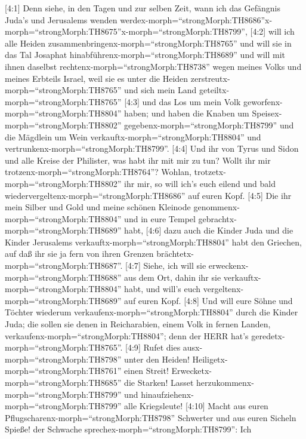  {[}4:1{]} Denn siehe, in den Tagen und zur selben Zeit,
wann ich das Gefängnis Juda's und Jerusalems wenden
werdex-morph=``strongMorph:TH8686''\textbar x-morph=``strongMorph:TH8675''x-morph=``strongMorph:TH8799'',
 {[}4:2{]} will ich alle Heiden
zusammenbringenx-morph=``strongMorph:TH8765'' und will sie in das Tal
Josaphat hinabführenx-morph=``strongMorph:TH8689'' und will mit ihnen
daselbst rechtenx-morph=``strongMorph:TH8738'' wegen meines Volks und
meines Erbteils Israel, weil sie es unter die Heiden
zerstreutx-morph=``strongMorph:TH8765'' und sich mein Land
geteiltx-morph=``strongMorph:TH8765''  {[}4:3{]} und das Los
um mein Volk geworfenx-morph=``strongMorph:TH8804'' haben; und haben die
Knaben um Speisex-morph=``strongMorph:TH8802''
gegebenx-morph=``strongMorph:TH8799'' und die Mägdlein um Wein
verkauftx-morph=``strongMorph:TH8804'' und
vertrunkenx-morph=``strongMorph:TH8799''.  {[}4:4{]} Und ihr
von Tyrus und Sidon und alle Kreise der Philister, was habt ihr mit mir
zu tun? Wollt ihr mir trotzenx-morph=``strongMorph:TH8764''? Wohlan,
trotzetx-morph=``strongMorph:TH8802'' ihr mir, so will ich's euch eilend
und bald wiedervergeltenx-morph=``strongMorph:TH8686'' auf euren Kopf.
 {[}4:5{]} Die ihr mein Silber und Gold und meine schönen
Kleinode genommenx-morph=``strongMorph:TH8804'' und in eure Tempel
gebrachtx-morph=``strongMorph:TH8689'' habt,  {[}4:6{]} dazu
auch die Kinder Juda und die Kinder Jerusalems
verkauftx-morph=``strongMorph:TH8804'' habt den Griechen, auf daß ihr
sie ja fern von ihren Grenzen brächtetx-morph=``strongMorph:TH8687''.
 {[}4:7{]} Siehe, ich will sie
erweckenx-morph=``strongMorph:TH8688'' aus dem Ort, dahin ihr sie
verkauftx-morph=``strongMorph:TH8804'' habt, und will's euch
vergeltenx-morph=``strongMorph:TH8689'' auf euren Kopf. 
{[}4:8{]} Und will eure Söhne und Töchter wiederum
verkaufenx-morph=``strongMorph:TH8804'' durch die Kinder Juda; die
sollen sie denen in Reicharabien, einem Volk in fernen Landen,
verkaufenx-morph=``strongMorph:TH8804''; denn der HERR hat's
geredetx-morph=``strongMorph:TH8765''.  {[}4:9{]} Rufet dies
ausx-morph=``strongMorph:TH8798'' unter den Heiden!
Heiligetx-morph=``strongMorph:TH8761'' einen Streit!
Erwecketx-morph=``strongMorph:TH8685'' die Starken! Lasset
herzukommenx-morph=``strongMorph:TH8799'' und
hinaufziehenx-morph=``strongMorph:TH8799'' alle Kriegsleute!
 {[}4:10{]} Macht aus euren
Pflugscharenx-morph=``strongMorph:TH8798'' Schwerter und aus euren
Sicheln Spieße! der Schwache sprechex-morph=``strongMorph:TH8799'': Ich
